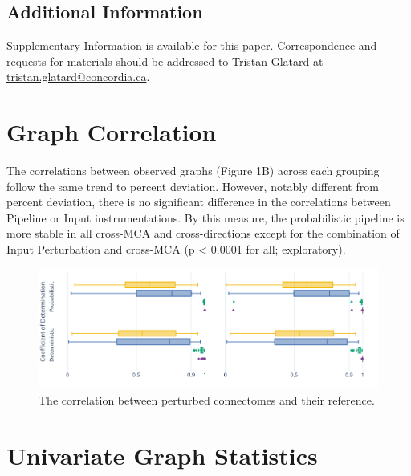 \documentclass[fleqn,10pt]{SelfArx} %
\begin{document}
\subsection*{Additional Information}
Supplementary Information is available for this paper. Correspondence and requests for materials should be addressed to
Tristan Glatard at \url{tristan.glatard@concordia.ca}.

\beginsupplement

\clearpage
\section{Graph Correlation}
\label{supsec:correlation}
The correlations between observed graphs (Figure 1B) across each grouping follow the same trend to percent deviation.
However, notably different from percent deviation, there is no significant difference in the correlations between
Pipeline or Input instrumentations. By this measure, the probabilistic pipeline is more stable in all cross-MCA and
cross-directions except for the combination of Input Perturbation and cross-MCA (p < 0.0001 for all; exploratory).

\begin{figure}[ht]\centering
\includegraphics[width=\linewidth]{figures/figS1_correlation_differences.pdf}
\caption{The correlation between perturbed connectomes and their reference.}
\label{fig:correlation}
\end{figure}

\clearpage
\section{Univariate Graph Statistics}
\label{supsec:univar}
\end{document}
